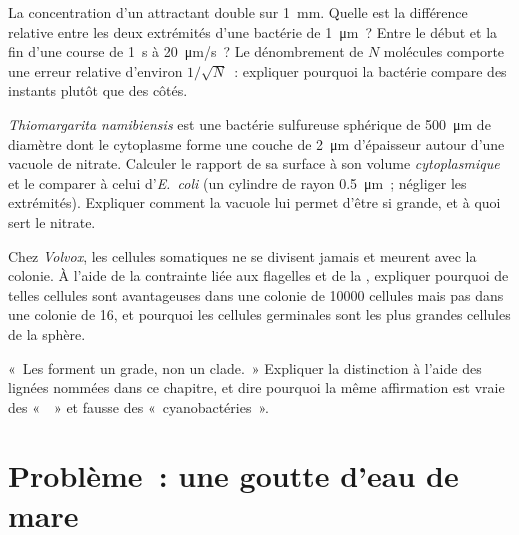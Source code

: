 \begin{exercise}[$\star\star$]\label{exo:b2:unicellular-diversity:9}
La concentration d'un attractant double sur \qty{1}{mm}. Quelle est la
différence relative entre les deux extrémités d'une bactérie de
\qty{1}{\micro m}~? Entre le début et la fin d'une course de \qty{1}{s}
à \qty{20}{\micro m/s}~? Le dénombrement de $N$ molécules comporte une
erreur relative d'environ $1/\sqrt{N}$~: expliquer pourquoi la bactérie
compare des instants plutôt que des côtés.
\end{exercise}

\begin{exercise}[$\star\star\star$]\label{exo:b2:unicellular-diversity:10}
\emph{Thiomargarita namibiensis} est une bactérie sulfureuse sphérique
de \qty{500}{\micro m} de diamètre dont le cytoplasme forme une couche
de \qty{2}{\micro m} d'épaisseur autour d'une vacuole de nitrate.
Calculer le rapport de sa surface à son volume \emph{cytoplasmique} et
le comparer à celui d'\emph{E.~coli} (un cylindre de rayon
\qty{0.5}{\micro m}~; négliger les extrémités). Expliquer comment la
vacuole lui permet d'être si grande, et à quoi sert le nitrate.
\end{exercise}

\begin{exercise}[$\star\star\star$]\label{exo:b2:unicellular-diversity:11}
Chez \emph{Volvox}, les cellules somatiques ne se divisent jamais et
meurent avec la colonie. À l'aide de la contrainte liée aux flagelles et
de la , expliquer pourquoi de telles cellules sont
avantageuses dans une colonie de \num{10000} cellules mais pas dans une
colonie de 16, et pourquoi les cellules germinales sont les plus
grandes cellules de la sphère.
\end{exercise}

\begin{exercise}[$\star\star\star$]\label{exo:b2:unicellular-diversity:12}
«~Les  forment un grade, non un clade.~» Expliquer la
distinction à l'aide des lignées nommées dans ce chapitre, et dire
pourquoi la même affirmation est vraie des «~~» et fausse
des «~cyanobactéries~».
\end{exercise}

\section{Problème~: une goutte d'eau de mare}

